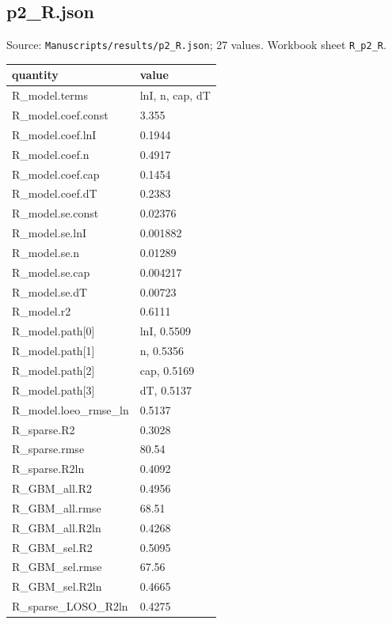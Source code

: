 \subsection*{p2\_R.json}
\noindent\small Source: \nolinkurl{Manuscripts/results/p2_R.json}; 27 values. Workbook sheet \texttt{R\_p2\_R}.\par
{\scriptsize\begin{longtable}{p{}p{}}\toprule\textbf{quantity} & \textbf{value}\\\midrule\endhead
{}R\_model.terms & lnI, n, cap, dT\\
{}R\_model.coef.const & 3.355\\
{}R\_model.coef.lnI & 0.1944\\
{}R\_model.coef.n & 0.4917\\
{}R\_model.coef.cap & 0.1454\\
{}R\_model.coef.dT & 0.2383\\
{}R\_model.se.const & 0.02376\\
{}R\_model.se.lnI & 0.001882\\
{}R\_model.se.n & 0.01289\\
{}R\_model.se.cap & 0.004217\\
{}R\_model.se.dT & 0.00723\\
{}R\_model.r2 & 0.6111\\
{}R\_model.path[0] & lnI, 0.5509\\
{}R\_model.path[1] & n, 0.5356\\
{}R\_model.path[2] & cap, 0.5169\\
{}R\_model.path[3] & dT, 0.5137\\
{}R\_model.loeo\_rmse\_ln & 0.5137\\
{}R\_sparse.R2 & 0.3028\\
{}R\_sparse.rmse & 80.54\\
{}R\_sparse.R2ln & 0.4092\\
{}R\_GBM\_all.R2 & 0.4956\\
{}R\_GBM\_all.rmse & 68.51\\
{}R\_GBM\_all.R2ln & 0.4268\\
{}R\_GBM\_sel.R2 & 0.5095\\
{}R\_GBM\_sel.rmse & 67.56\\
{}R\_GBM\_sel.R2ln & 0.4665\\
{}R\_sparse\_LOSO\_R2ln & 0.4275\\
\bottomrule\end{longtable}}

